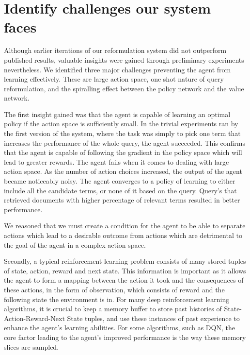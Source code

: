 \section{Identify challenges our system faces}

Although earlier iterations of our reformulation system did not outperform published results, valuable insights were gained through preliminary experiments nevertheless. We identified three major challenges preventing the agent from learning effectively. These are large action space, one shot nature of query reformulation, and the spiralling effect between the policy network and the value network. 

The first insight gained was that the agent is capable of learning an optimal policy if the action space is sufficiently small. In the trivial experiments ran by the first version of the system, where the task was simply to pick one term that increases the performance of the whole query, the agent succeeded. This confirms that the agent is capable of following the gradient in the policy space which will lead to greater rewards. The agent fails when it comes to dealing with large action space.  As the number of action choices increased, the output of the agent became noticeably noisy. The agent converges to a policy of learning to either include all the candidate terms, or none of it based on the query. Query's that retrieved documents with higher percentage of relevant terms resulted in better performance. 

We reasoned that we must create a condition for the agent to be able to separate actions which lead to a desirable outcome from actions which are detrimental to the goal of the agent in a complex action space. 

Secondly, a typical reinforcement learning problem consists of many stored tuples of state, action, reward and next state. This information is important as it allows the agent to form a mapping between the action it took and the consequences of these actions, in the form of observation, which consists of reward and the following state the environment is in.  For many deep reinforcement learning algorithms, it is crucial to keep a memory buffer to store past histories of State-Action-Reward-Next State tuples, and use these instances of past experience to enhance the agent’s learning abilities. For some algorithms, such as DQN\cite{mnih2015human}, the core factor leading to the agent’s improved performance is the way these memory slices are sampled. 

